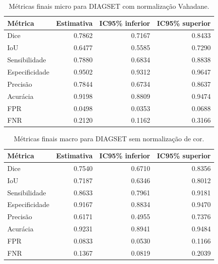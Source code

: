 \begin{table}[!htb]
\centering
\caption{Métricas finais micro para DIAGSET com normalização Vahadane.}
\label{tab:results_diagset-micro-vahadane}
\small
\begin{tabular}{lrrr}
\toprule
Métrica & Estimativa & IC95\% inferior & IC95\% superior \\
\midrule
Dice & 0.7862 & 0.7167 & 0.8433 \\
IoU & 0.6477 & 0.5585 & 0.7290 \\
Sensibilidade & 0.7880 & 0.6834 & 0.8838 \\
Especificidade & 0.9502 & 0.9312 & 0.9647 \\
Precisão & 0.7844 & 0.6734 & 0.8637 \\
Acurácia & 0.9198 & 0.8809 & 0.9474 \\
FPR & 0.0498 & 0.0353 & 0.0688 \\
FNR & 0.2120 & 0.1162 & 0.3166 \\
\bottomrule
\end{tabular}
\end{table}

\begin{table}[!htb]
\centering
\caption{Métricas finais macro para DIAGSET sem normalização de cor.}
\label{tab:results_diagset-macro-not_normalized}
\small
\begin{tabular}{lrrr}
\toprule
Métrica & Estimativa & IC95\% inferior & IC95\% superior \\
\midrule
Dice & 0.7540 & 0.6710 & 0.8356 \\
IoU & 0.7187 & 0.6346 & 0.8012 \\
Sensibilidade & 0.8633 & 0.7961 & 0.9181 \\
Especificidade & 0.9167 & 0.8834 & 0.9470 \\
Precisão & 0.6171 & 0.4955 & 0.7376 \\
Acurácia & 0.9231 & 0.8941 & 0.9484 \\
FPR & 0.0833 & 0.0530 & 0.1166 \\
FNR & 0.1367 & 0.0819 & 0.2039 \\
\bottomrule
\end{tabular}
\end{table}


